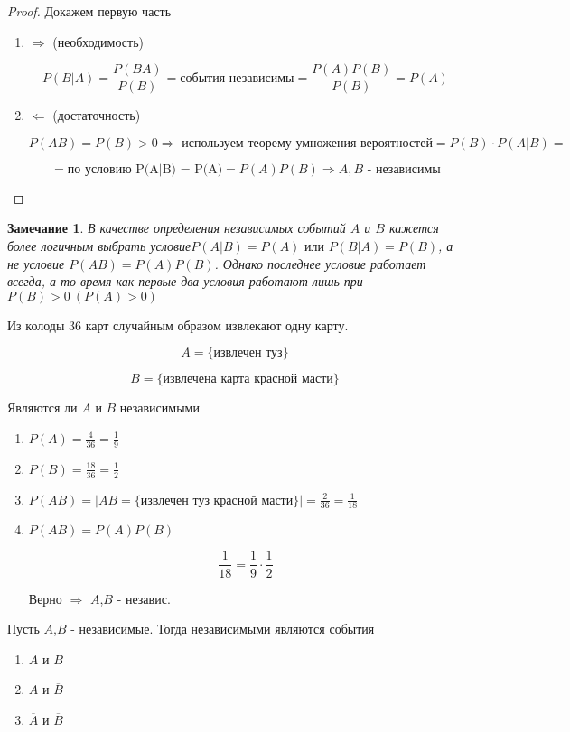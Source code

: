 \documentclass[a4paper, 14pt]{report}
\newtheorem{note}{Замечание}[chapter]
\begin{document}
\begin{proof}
    Докажем первую часть

    \begin{enumerate}
        \item $\Rightarrow$ (необходимость)

            $$
            P(B|A) = \frac{P(BA)}{P(B)} = \text{события независимы} = \frac{P(A)P(B)}{P(B)} = P(A)
            $$

        \item $\Leftarrow$ (достаточность)

            $$
            P(AB) = P(B) > 0 \Rightarrow \text{ используем теорему умножения вероятностей} = P(B) \cdot P(A|B) = 
            $$

            $$
            = \text{по условию P(A|B) = P(A)} = P(A)P(B) \Rightarrow A,B \text{ - независимы}
            $$
    \end{enumerate}
\end{proof}

\begin{note}
    В качестве определения независимых событий $A$ и $B$ кажется более логичным выбрать условие$P(A|B) = P(A) \text{ или } P(B|A) = P(B)$, а не условие  $P(AB) = P(A)P(B)$. Однако последнее условие работает всегда, а то время как первые два условия работают лишь при $P(B) > 0\ (P(A) > 0)$
\end{note}

Из колоды 36 карт случайным образом извлекают одну карту.

$$
A = \{ \text{извлечен туз} \}
$$

$$
B = \{ \text{извлечена карта красной масти} \}
$$

Являются ли $A$ и $B$ независимыми

\begin{enumerate}
    \item $P(A) = \frac{4}{36} = \frac{1}{9}$
    \item $P(B) = \frac{18}{36} = \frac{1}{2}$
    \item $P(AB) = | AB = \{ \text{извлечен туз красной масти} \} | = \frac{2}{36} = \frac{1}{18}$
    \item $P(AB) = P(A)P(B)$

        $$
        \frac{1}{18} = \frac{1}{9} \cdot \frac{1}{2}
        $$

        Верно $\Rightarrow$ $A$,$B$ - независ.
\end{enumerate}

\begin{theorem}
    Пусть $A$,$B$ - независимые. Тогда независимыми являются события

    \begin{enumerate}
        \item $\overline A$ и $B$
        \item $A$ и $\overline B$
        \item $\overline A$ и $\overline B$
    \end{enumerate}
\end{theorem}
\end{document}
